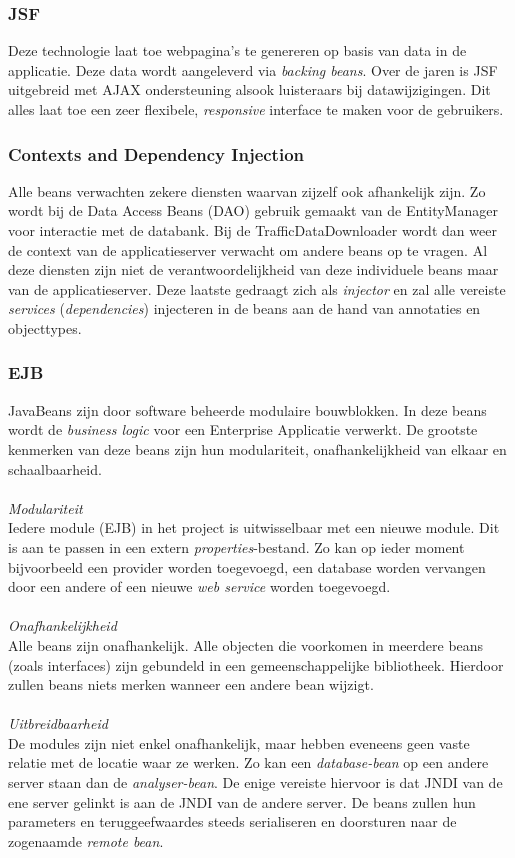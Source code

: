 \documentclass[ps,a4paper,oneside]{report}
\begin{document}
\subsubsection{JSF}
Deze technologie laat toe webpagina's te genereren op basis van data in de applicatie. Deze data wordt aangeleverd via \textit{backing beans}. Over de jaren is JSF uitgebreid met AJAX ondersteuning alsook luisteraars bij datawijzigingen. Dit alles laat toe een zeer flexibele, \textit{responsive} interface te maken voor de gebruikers.
\subsubsection{Contexts and Dependency Injection}
Alle beans verwachten zekere diensten waarvan zijzelf ook afhankelijk zijn. Zo wordt bij de Data Access Beans (DAO) gebruik gemaakt van de EntityManager voor interactie met de databank. Bij de TrafficDataDownloader wordt dan weer de context van de applicatieserver verwacht om andere beans op te vragen. Al deze diensten zijn niet de verantwoordelijkheid van deze individuele beans maar van de applicatieserver. Deze laatste gedraagt zich als \textit{injector} en zal alle vereiste \textit{services} (\textit{dependencies}) injecteren in de beans aan de hand van annotaties en objecttypes.
\subsubsection{EJB}
JavaBeans zijn door software beheerde modulaire bouwblokken. In deze beans wordt de \textit{business logic} voor een Enterprise Applicatie verwerkt. De grootste kenmerken van deze beans zijn hun modulariteit, onafhankelijkheid van elkaar en schaalbaarheid.\\\\
\textit{Modulariteit}\\
Iedere module (EJB) in het project is uitwisselbaar met een nieuwe module. Dit is aan te passen in een extern \textit{properties}-bestand. Zo kan op ieder moment bijvoorbeeld een provider worden toegevoegd, een database worden vervangen door een andere of een nieuwe \textit{web service} worden toegevoegd.\\\\
\textit{Onafhankelijkheid}\\
Alle beans zijn onafhankelijk. Alle objecten die voorkomen in meerdere beans (zoals interfaces) zijn gebundeld in een gemeenschappelijke bibliotheek. Hierdoor zullen beans niets merken wanneer een andere bean wijzigt.\\\\
\textit{Uitbreidbaarheid}\\
De modules zijn niet enkel onafhankelijk, maar hebben eveneens geen vaste relatie met de locatie waar ze werken. Zo kan een \textit{database-bean} op een andere server staan dan de \textit{analyser-bean}. De enige vereiste hiervoor is dat JNDI van de ene server gelinkt is aan de JNDI van de andere server. De beans zullen hun parameters en teruggeefwaardes steeds serialiseren en doorsturen naar de zogenaamde \textit{remote bean}.
\end{document}

